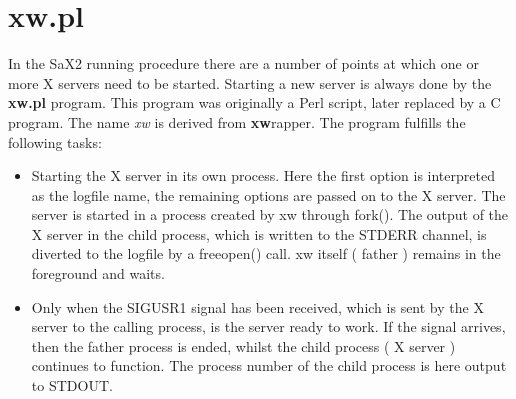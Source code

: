 \section{xw.pl}
\label{sec:xw}
In the SaX2 running procedure there are a number of points at which one or
more X servers need to be started. Starting a new server is always done by the
\textbf{xw.pl} program.
This program was originally a Perl script, later replaced by a C program. The
name \textit{xw} is derived from \textbf{xw}rapper. The program fulfills the
following tasks:
\begin{itemize}
\item Starting the X server in its own process. Here the first option is
  interpreted as the logfile name, the remaining options are passed on to the
  X server. The server is started in a process created by xw through
  fork(). The output of the X server in the child process, which is written
  to the STDERR channel, is diverted to the logfile by a freeopen() call.
      xw itself ( father ) remains in the foreground and waits. 
\item Only when the SIGUSR1 signal has been received, which is sent by the X
  server to the calling process, is the server ready to work. If the signal
  arrives, then the father process is ended, whilst the child process ( X
  server ) continues to function. The process number of the child process is
  here output to STDOUT.
\end{itemize}

